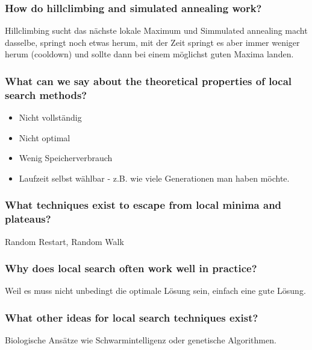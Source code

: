 \subsubsection{How do hillclimbing and simulated annealing work?}
Hillclimbing sucht das nächste lokale Maximum und Simmulated annealing macht dasselbe, springt noch etwas herum, mit der Zeit springt es aber immer weniger herum (cooldown) und sollte dann bei einem möglichst guten Maxima landen.
\subsubsection{What can we say about the theoretical properties of local search methods?}
\begin{itemize}
	\item Nicht vollständig
	\item Nicht optimal
	\item Wenig Speicherverbrauch
	\item Laufzeit selbst wählbar - z.B. wie viele Generationen man haben möchte.
\end{itemize}
\subsubsection{What techniques exist to escape from local minima and plateaus?}
Random Restart, Random Walk
\subsubsection{Why does local search often work well in practice?}
Weil es muss nicht unbedingt die optimale Lösung sein, einfach eine gute Lösung.
\subsubsection{What other ideas for local search techniques exist?}
Biologische Ansätze wie Schwarmintelligenz oder genetische Algorithmen.